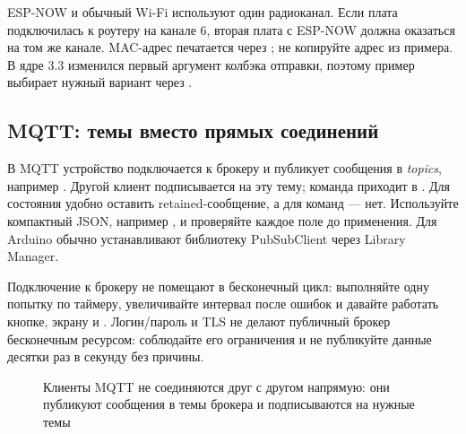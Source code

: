 
\begin{caution}
ESP-NOW и обычный Wi-Fi используют один радиоканал. Если плата подключилась к роутеру на канале 6,
вторая плата с ESP-NOW должна оказаться на том же канале. MAC-адрес печатается через
; не копируйте адрес из примера. В ядре 3.3 изменился первый
аргумент колбэка отправки, поэтому пример выбирает нужный вариант через .
\end{caution}

\subsection{MQTT: темы вместо прямых соединений}

В MQTT устройство подключается к брокеру и публикует сообщения в \emph{topics}, например
. Другой клиент подписывается на эту тему; команда приходит в
. Для состояния удобно оставить retained-сообщение, а для команд --- нет.
Используйте компактный JSON, например , и проверяйте каждое поле до
применения. Для Arduino обычно устанавливают библиотеку PubSubClient через Library Manager.

Подключение к брокеру не помещают в бесконечный цикл: выполняйте одну попытку по таймеру, увеличивайте
интервал после ошибок и давайте работать кнопке, экрану и . Логин/пароль и TLS
не делают публичный брокер бесконечным ресурсом: соблюдайте его ограничения и не публикуйте данные
десятки раз в секунду без причины.

\begin{figure}[H]
\centering
{}
\caption{Клиенты MQTT не соединяются друг с другом напрямую: они публикуют сообщения в темы брокера
и подписываются на нужные темы}
\end{figure}

